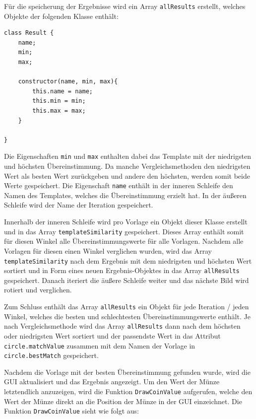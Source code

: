 Für die speicherung der Ergebnisse wird ein Array \texttt{allResults} erstellt, welches Objekte der folgenden Klasse enthält:

\begin{lstlisting}[style=JavaScript]
class Result {
    name;
    min;
    max;

    constructor(name, min, max){
        this.name = name;
        this.min = min;
        this.max = max;
    }

}
\end{lstlisting}

Die Eigenschaften \texttt{min} und \texttt{max} enthalten dabei das Template mit der niedrigsten und höchsten Übereinstimmung. Da manche Vergleichsmethoden den niedrigsten Wert als besten Wert zurückgeben und andere den höchsten, werden somit beide Werte gespeichert. Die Eigenschaft \texttt{name} enthält in der inneren Schleife den Namen des Templates, welches die Übereinstimmung erzielt hat. In der äußeren Schleife wird der Name der Iteration gespeichert.

Innerhalb der inneren Schleife wird pro Vorlage ein Objekt dieser Klasse erstellt und in das Array \texttt{templateSimilarity} gespeichert. Dieses Array enthält somit für diesen Winkel alle Übereinstimmungswerte für alle Vorlagen. Nachdem alle Vorlagen für diesen einen Winkel verglichen wurden, wird das Array \texttt{templateSimilarity} nach dem Ergebnis mit dem niedrigsten und höchsten Wert sortiert und in Form eines neuen Ergebnis-Objektes in das Array \texttt{allResults} gespeichert. Danach iteriert die äußere Schleife weiter und das nächste Bild wird rotiert und verglichen.

Zum Schluss enthält das Array \texttt{allResults} ein Objekt für jede Iteration / jeden Winkel, welches die besten und schlechtesten Übereinstimmungswerte enthält. Je nach Vergleichsmethode wird das Array \texttt{allResults} dann nach dem höchsten oder niedrigsten Wert sortiert und der passendste Wert in das Attribut \texttt{circle.matchValue} zusammen mit dem Namen der Vorlage in \texttt{circle.bestMatch} gespeichert.

Nachdem die Vorlage mit der besten Übereinstimmung gefunden wurde, wird die GUI aktualisiert und das Ergebnis angezeigt. Um den Wert der Münze letztendlich anzuzeigen, wird die Funktion \texttt{DrawCoinValue} aufgerufen, welche den Wert der Münze direkt an die Position der Münze in der GUI einzeichnet. Die Funktion \texttt{DrawCoinValue} sieht wie folgt aus:

